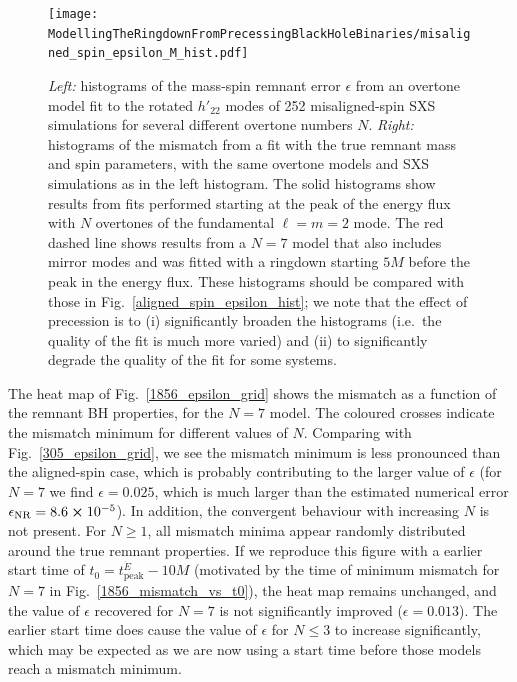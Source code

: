 \begin{figure}[t]
    \centering
    \texttt{[image: ModellingTheRingdownFromPrecessingBlackHoleBinaries/misaligned\_spin\_epsilon\_M\_hist.pdf]}
    \caption[Remnant-property errors and mismatches for the overtone model fitted to misaligned-spin SXS simulations]{
    \emph{Left:} histograms of the mass-spin remnant error $\epsilon$ from an overtone model fit to the rotated $h'_{22}$ modes of 252 misaligned-spin SXS simulations for several different overtone numbers $N$. 
    \emph{Right:} histograms of the mismatch from a fit with the true remnant mass and spin parameters, with the same overtone models and SXS simulations as in the left histogram.
    The solid histograms show results from fits performed starting at the peak of the energy flux with $N$ overtones of the fundamental $\ell = m = 2$ mode.
    The red dashed line shows results from a $N=7$ model that also includes mirror modes and was fitted with a ringdown starting $5M$ before the peak in the energy flux.
    These histograms should be compared with those in Fig.~\ref{aligned_spin_epsilon_hist}; we note that the effect of precession is to (i) significantly broaden the histograms (i.e.\ the quality of the fit is much more varied) and (ii) to significantly degrade the quality of the fit for some systems.
    }
    \label{misaligned_spin_epsilon_hist}
\end{figure}

The heat map of Fig.~\ref{1856_epsilon_grid} shows the mismatch as a function of the remnant BH properties, for the $N=7$ model.
The coloured crosses indicate the mismatch minimum for different values of $N$. 
Comparing with Fig.~\ref{305_epsilon_grid}, we see the mismatch minimum is less pronounced than the aligned-spin case, which is probably contributing to the larger value of $\epsilon$ (for $N=7$ we find $\epsilon = 0.025$, which is much larger than the estimated numerical error $\epsilon_{\mathrm{NR}} = 8.6 \cross 10^{-5}$). 
In addition, the convergent behaviour with increasing $N$ is not present. For $N \geq 1$, all mismatch minima appear randomly distributed around the true remnant properties.
If we reproduce this figure with a earlier start time of $t_0 = t_{\mathrm{peak}}^{\dot{E}} - 10M$ (motivated by the time of minimum mismatch for $N=7$ in Fig.~\ref{1856_mismatch_vs_t0}), the heat map remains unchanged, and the value of $\epsilon$ recovered for $N=7$ is not significantly improved ($\epsilon = 0.013$). The earlier start time does cause the value of $\epsilon$ for $N \leq 3$ to increase significantly, which may be expected as we are now using a start time before those models reach a mismatch minimum. 

